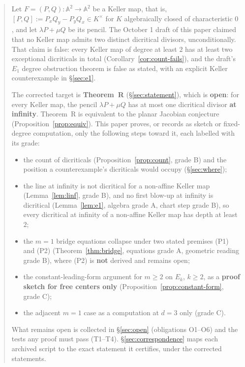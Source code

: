 \documentclass[a4paper,11pt]{article}
\theoremstyle{plain}
\theoremstyle{definition}
\theoremstyle{remark}
\begin{document}
\begin{abstract}
Let $F = (P,Q) \colon \mathbb{A}^2 \to \mathbb{A}^2$ be a Keller map, that is,
$[P,Q] := P_x Q_y - P_y Q_x \in K^\times$ for $K$ algebraically closed of characteristic $0$,
and let $\lambda P + \mu Q$ be its pencil. The October 1 draft of this paper claimed that no
Keller map admits two distinct dicritical divisors, unconditionally. That claim is false: every
Keller map of degree at least $2$ has at least two exceptional dicriticals in total
(Corollary~\ref{cor:count-fails}), and the draft's $E_1$ degree obstruction
theorem is false as stated, with an explicit Keller
counterexample in \S\ref{sec:e1}.

The corrected target is \textbf{Theorem~R} (\S\ref{sec:statement}), which is \textbf{open}:
for every Keller map, the pencil $\lambda P + \mu Q$ has at most one dicritical divisor
\textbf{at infinity}. Theorem~R is equivalent to the planar Jacobian conjecture
(Proposition~\ref{prop:equiv}). This paper proves, or records as sketch or fixed-degree
computation, only the following steps toward it, each labelled with its grade:
\begin{itemize}[nosep]
\item the count of dicriticals (Proposition~\ref{prop:count}, grade B) and the position a
counterexample's dicriticals would occupy (\S\ref{sec:where});
\item the line at infinity is not dicritical for a non-affine Keller map
(Lemma~\ref{lem:linf}, grade B), and no first blow-up at infinity is dicritical
(Lemma~\ref{lem:e1}, algebra grade A, chart step grade B), so every dicritical at infinity
of a non-affine Keller map has depth at least $2$;
\item the $m = 1$ bridge equations collapse under two stated premises (P1) and (P2)
(Theorem~\ref{thm:bridge}, equations grade A, geometric reading grade B), where (P2) is
\textbf{not} derived and remains open;
\item the constant-leading-form argument for $m \geq 2$ on $E_k$, $k \geq 2$, as a
\textbf{proof sketch for free centers only} (Proposition~\ref{prop:constant-form}, grade C);
\item the adjacent $m = 1$ case as a computation at $d = 3$ only (grade C).
\end{itemize}
What remains open is collected in \S\ref{sec:open} (obligations O1--O6) and the tests any
proof must pass (T1--T4). \S\ref{sec:correspondence} maps each archived script to the exact
statement it certifies, under the corrected statements.
\end{abstract}
\end{document}

